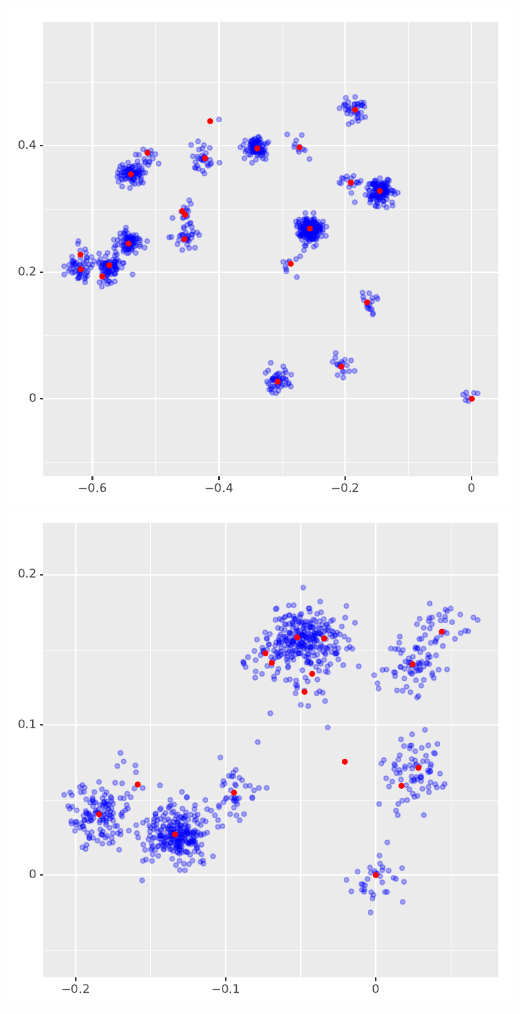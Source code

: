 \documentclass[landscape,footrule]{foils}
\begin{document}
\centerline{
\includegraphics[scale=0.55]{fast_meme_generation_ii}
\includegraphics[scale=0.55]{fast_meme_generation_iii}
}
\end{document}
